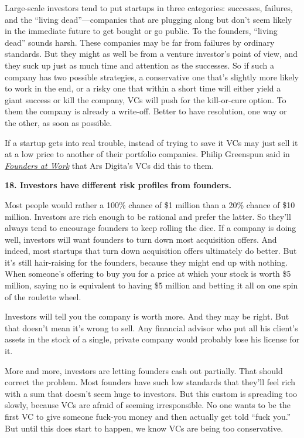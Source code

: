 \documentclass[12pt]{book}
\begin{document}
Large-scale investors tend to put startups in three categories:
successes, failures, and the ``living dead''---companies that are
plugging along but don't seem likely in the immediate future to get
bought or go public. To the founders, ``living dead'' sounds harsh.
These companies may be far from failures by ordinary standards. But they
might as well be from a venture investor's point of view, and they suck
up just as much time and attention as the successes. So if such a
company has two possible strategies, a conservative one that's slightly
more likely to work in the end, or a risky one that within a short time
will either yield a giant success or kill the company, VCs will push for
the kill-or-cure option. To them the company is already a write-off.
Better to have resolution, one way or the other, as soon as possible.

If a startup gets into real trouble, instead of trying to save it VCs
may just sell it at a low price to another of their portfolio companies.
Philip Greenspun said in
\href{http://www.amazon.com/gp/product/1590597141}{\emph{Founders at
Work}} that Ars Digita's VCs did this to them.

\textbf{18. Investors have different risk profiles from founders.}

Most people would rather a 100\% chance of \$1 million than a 20\%
chance of \$10 million. Investors are rich enough to be rational and
prefer the latter. So they'll always tend to encourage founders to keep
rolling the dice. If a company is doing well, investors will want
founders to turn down most acquisition offers. And indeed, most startups
that turn down acquisition offers ultimately do better. But it's still
hair-raising for the founders, because they might end up with nothing.
When someone's offering to buy you for a price at which your stock is
worth \$5 million, saying no is equivalent to having \$5 million and
betting it all on one spin of the roulette wheel.

Investors will tell you the company is worth more. And they may be
right. But that doesn't mean it's wrong to sell. Any financial advisor
who put all his client's assets in the stock of a single, private
company would probably lose his license for it.

More and more, investors are letting founders cash out partially. That
should correct the problem. Most founders have such low standards that
they'll feel rich with a sum that doesn't seem huge to investors. But
this custom is spreading too slowly, because VCs are afraid of seeming
irresponsible. No one wants to be the first VC to give someone fuck-you
money and then actually get told ``fuck you.'' But until this does start
to happen, we know VCs are being too conservative.
\end{document}
